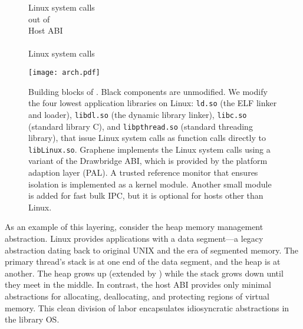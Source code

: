 \begin{figure}[t]
\centering
\begin{minipage}[b]{1.25in}
\footnotesize
\raggedleft
Linux system calls \\
\graphenesyscallnum{} out of \linuxsyscallnum{}\\
\vspace{0.1in}
Host ABI \\
\palcallnum{} \hostapis{}\\
\vspace{0.2in}
\hostsyscallnum{} Linux system calls
\vspace{0.35in}
\end{minipage}
\hspace{-1.25in}
\texttt{[image: arch.pdf]}
\caption{Building blocks of \graphene{}.  Black components are unmodified.
We modify the four lowest application libraries on Linux:
{\tt ld.so} (the ELF linker and loader),
{\tt libdl.so} (the dynamic library linker),
{\tt libc.so} (standard library C),
and {\tt libpthread.so} (standard threading library), that issue Linux system calls as function calls directly to {\tt libLinux.so}.
Graphene implements the Linux system calls using a variant of the Drawbridge ABI, which is provided by the platform adaption layer (PAL).
A trusted reference monitor that ensures \libos{} isolation is implemented as a kernel module. Another small module is added for fast bulk IPC, but it is optional for hosts other than Linux.}
\label{fig:overview:arch}
\end{figure}


As an example of this layering, consider the heap memory management abstraction. Linux provides applications with a data segment---a legacy abstraction dating back to original UNIX and the era of segmented memory. The primary thread's stack is at one end of the data segment, and the heap is at another.  The heap grows up (extended by ) while the stack grows down until they meet in the middle.
In contrast, the host ABI provides only minimal abstractions for allocating, deallocating, and protecting regions of virtual memory.
This clean division of labor encapsulates idiosyncratic abstractions
in the library OS.



